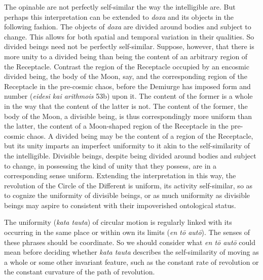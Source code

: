 The opinable are not perfectly self-similar the way the intelligible are. But perhaps this interpretation can be extended to \emph{doxa} and its objects in the following fashion. The objects of \emph{doxa} are divided around bodies and subject to change. This allows for both spatial and temporal variation in their qualities. So divided beings need not be perfectly self-similar. Suppose, however, that there is more unity to a divided being than being the content of an arbitrary region of the Receptacle. Contrast the region of the Receptacle occupied by an encosmic divided being, the body of the Moon, say, and the corresponding region of the Receptacle in the pre-cosmic chaos, before the Demiurge has imposed form and number (\emph{eidesi kai arithmois} 53b) upon it. The content of the former is a whole in the way that the content of the latter is not. The content of the former, the body of the Moon, a divisible being, is thus correspondingly more uniform than the latter, the content of a Moon-shaped region of the Receptacle in the pre-cosmic chaos. A divided being may be the content of a region of the Receptacle, but its unity imparts an imperfect uniformity to it akin to the self-similarity of the intelligible. Divisible beings, despite being divided around bodies and subject to change, in possessing the kind of unity that they possess, are in a corresponding sense uniform. Extending the interpretation in this way, the revolution of the Circle of the Different is uniform, its activity self-similar, so as to cognize the uniformity of divisible beings, or as much uniformity as divisible beings may aspire to consistent with their impoverished ontological status.

The uniformity (\emph{kata tauta}) of circular motion is regularly linked with its occurring in the same place or within own its limits (\emph{en tō autō}). The senses of these phrases should be coordinate. So we should consider what \emph{en tō autō} could mean before deciding whether \emph{kata tauta} describes the self-similarity of moving as a whole or some other invariant feature, such as the constant rate of revolution or the constant curvature of the path of revolution.



